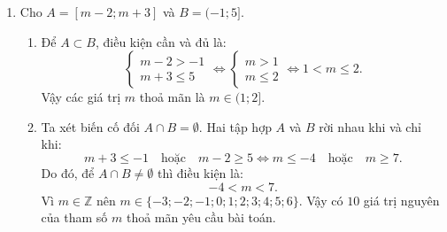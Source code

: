\documentclass[12pt,a4paper]{article}
\begin{document}
\begin{enumerate}
\begin{center}
\end{center}
Xét tam giác vuông $BDC$ tại $D$ có $\widehat{CBD} = 45^\circ$, nên tam giác $BDC$ vuông cân tại $D$. Do đó:
\[
BD = CD = h.
\]
Xét tam giác vuông $ADC$ tại $D$ có $\widehat{CAD} = 30^\circ$:
\[
AD = \dfrac{CD}{\tan 30^\circ} = \dfrac{h}{\frac{1}{\sqrt{3}}} = h\sqrt{3}.
\]
Mặt khác, điểm $B$ nằm giữa $A$ và $D$ nên:
\[
AD - BD = AB \iff h\sqrt{3} - h = 24 \iff h(\sqrt{3} - 1) = 24.
\]
Suy ra chiều cao của toà tháp là:
\[
h = \dfrac{24}{\sqrt{3} - 1} = \dfrac{24(\sqrt{3} + 1)}{(\sqrt{3} - 1)(\sqrt{3} + 1)} = \dfrac{24(\sqrt{3} + 1)}{2} = 12(\sqrt{3} + 1)\text{ m}.
\]
Làm tròn kết quả: $h \approx 12(1{,}73205 + 1) = 32{,}7846\dots \approx 32{,}8\text{ m}$.
Vậy toà tháp canh cao xấp xỉ $32{,}8\text{ m}$.

\item Cho $A = [m - 2; m + 3]$ và $B = (-1; 5]$.
\begin{enumerate}
    \item Để $A \subset B$, điều kiện cần và đủ là:
    \[
    \begin{cases}
    m - 2 > -1 \\
    m + 3 \le 5
    \end{cases}
    \iff
    \begin{cases}
    m > 1 \\
    m \le 2
    \end{cases}
    \iff 1 < m \le 2.
    \]
    Vậy các giá trị $m$ thoả mãn là $m \in (1; 2]$.
    \item Ta xét biến cố đối $A \cap B = \emptyset$.
    Hai tập hợp $A$ và $B$ rời nhau khi và chỉ khi:
    \[
    m + 3 \le -1 \quad\text{hoặc}\quad m - 2 \ge 5
    \iff m \le -4 \quad\text{hoặc}\quad m \ge 7.
    \]
    Do đó, để $A \cap B \ne \emptyset$ thì điều kiện là:
    \[
    -4 < m < 7.
    \]
    Vì $m \in \mathbb{Z}$ nên $m \in \{-3; -2; -1; 0; 1; 2; 3; 4; 5; 6\}$.
    Vậy có $10$ giá trị nguyên của tham số $m$ thoả mãn yêu cầu bài toán.
\end{enumerate}


\end{enumerate}
\end{document}
